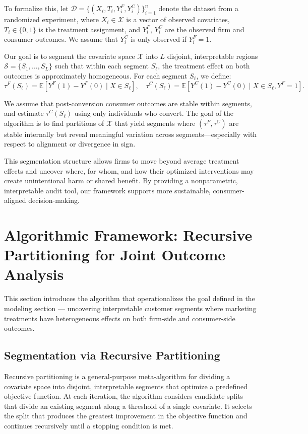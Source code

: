 \documentclass[11pt,letterpaper,english]{article}
\theoremstyle{definition}
\theoremstyle{definition}
\begin{document}
\begin{bibunit}
To formalize this, let $\mathcal{D} = \{(X_i, T_i, Y_i^F, Y_i^C)\}_{i=1}^n$ denote the dataset from a randomized experiment, where $X_i \in \mathcal{X}$ is a vector of observed covariates, $T_i \in \{0,1\}$ is the treatment assignment, and $Y_i^F$, $Y_i^C$ are the observed firm and consumer outcomes. We assume that $Y_i^C$ is only observed if $Y_i^F = 1$.

Our goal is to segment the covariate space $\mathcal{X}$ into $L$ disjoint, interpretable regions $\mathcal{S} = \{S_1, \dots, S_L\}$ such that within each segment $S_\ell$, the treatment effect on both outcomes is approximately homogeneous. For each segment $S_\ell$, we define:
\[
\tau^F(S_\ell) = \mathbb{E}[Y^F(1) - Y^F(0) \mid X \in S_\ell], \quad
\tau^C(S_\ell) = \mathbb{E}[Y^C(1) - Y^C(0) \mid X \in S_\ell, Y^F = 1].
\]

We assume that post-conversion consumer outcomes are stable within segments, and estimate $\tau^C(S_\ell)$ using only individuals who convert. The goal of the algorithm is to find partitions of $\mathcal{X}$ that yield segments where $(\tau^F, \tau^C)$ are stable internally but reveal meaningful variation across segments—especially with respect to alignment or divergence in sign.

This segmentation structure allows firms to move beyond average treatment effects and uncover where, for whom, and how their optimized interventions may create unintentional harm or shared benefit. By providing a nonparametric, interpretable audit tool, our framework supports more sustainable, consumer-aligned decision-making.


\label{ssec:setting}


\section{Algorithmic Framework: Recursive Partitioning for Joint Outcome Analysis}
This section introduces the algorithm that operationalizes the goal defined in the modeling section — uncovering interpretable customer segments where marketing treatments have heterogeneous effects on both firm-side and consumer-side outcomes.

\subsection{Segmentation via Recursive Partitioning}
\label{ssec:recur_part}

Recursive partitioning is a general-purpose meta-algorithm for dividing a covariate space into disjoint, interpretable segments that optimize a predefined objective function. At each iteration, the algorithm considers candidate splits that divide an existing segment along a threshold of a single covariate. It selects the split that produces the greatest improvement in the objective function and continues recursively until a stopping condition is met. 


\end{bibunit}
\end{document}
